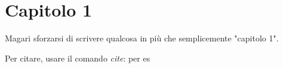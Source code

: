 \chapter{Capitolo 1} 

Magari sforzarsi di scrivere qualcosa in più che semplicemente "capitolo 1".

Per citare, usare il comando \textit{cite}: per es \cite{pauli:ModelloLineare}